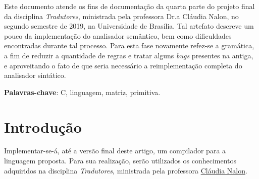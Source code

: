 \documentclass[
	article,			%
	11pt,				%
	oneside,			%
	a4paper,			%
	english,			%
	brazil,				%
	sumario=tradicional
	]{abntex2}
\renewcommand{\it}[1]{\textit{#1}}
\begin{document}

\frenchspacing 


%
%

\maketitle





\begin{resumoumacoluna}
 Este documento atende os fins de documentação da quarta
 parte do projeto final da disciplina \textit{Tradutores},
 ministrada pela professora Dr.a Cláudia Nalon, no segundo semestre de 2019, na Universidade de Brasília. Tal artefato descreve um pouco da implementação do analisador semântico, bem como dificuldades encontradas durante tal processo. Para esta fase novamente refez-se a gramática, a fim de reduzir a quantidade de regras e tratar alguns \it{bugs} presentes na antiga, e aproveitando o fato de que seria necessário a reimplementação completa do analisador sintático.
 \vspace{\onelineskip}
 
 \noindent
 \textbf{Palavras-chave}: C, linguagem, matriz, primitiva.
\end{resumoumacoluna}




\newcommand{\terminal}[1]{ \bnfpn{\textbf{#1}} }

\newcommand{\production}[1]{\bnfpn{\textit{#1}}}
\newcommand{\IT}[1]{\textit{#1}}
\newcommand{\BF}[1]{\textbf{#1}}


\section{Introdução}
Implementar-se-á, até a versão final deste artigo, um compilador para a linguagem proposta. Para sua realização, serão utilizados os conhecimentos adquiridos na disciplina \textit{Tradutores}, ministrada pela professora \hyperref{http://lattes.cnpq.br/7793795625581127}{}{}{Cláudia Nalon}.
\end{document}
